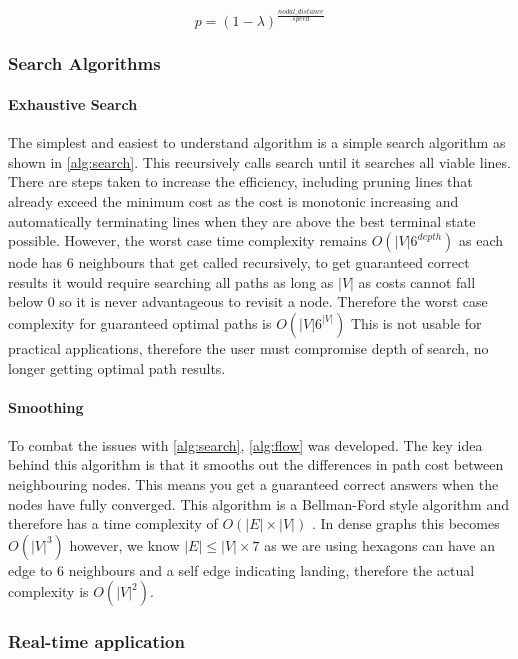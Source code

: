 \begin{equation}\label{eq:p calc}
    p = (1-\lambda)^{\frac{nodal\_distance}{speed}}
\end{equation}

\subsubsection{Search Algorithms}


\paragraph{Exhaustive Search}
The simplest and easiest to understand algorithm is a simple search algorithm as shown in \ref{alg:search}. This recursively calls search until it searches all viable lines. There are steps taken to increase the efficiency, including pruning lines that already exceed the minimum cost as the cost is monotonic increasing and automatically terminating lines when they are above the best terminal state possible. However, the worst case time complexity remains $O(|V|6^{depth})$ as each node has 6 neighbours that get called recursively, to get guaranteed correct results it would require searching all paths as long as $|V|$ as costs cannot fall below 0 so it is never advantageous to revisit a node. Therefore the worst case complexity for guaranteed optimal paths is $O(|V|6^{|V|})$ This is not usable for practical applications, therefore the user must compromise depth of search, no longer getting optimal path results.
\paragraph{Smoothing}
To combat the issues with \ref{alg:search}, \ref{alg:flow} was developed. The key idea behind this algorithm is that it smooths out the differences in path cost between neighbouring nodes. This means you get a guaranteed correct answers when the nodes have fully converged. This algorithm is a Bellman-Ford style algorithm and therefore has a time complexity of $O(|E|\times |V|)$ \cite{REF}. In dense graphs this becomes  $O(|V|^3)$ however, we know $|E| \leq |V| \times 7$ as we are using hexagons can have an edge to 6 neighbours and a self edge indicating landing, therefore the actual complexity is $O(|V|^2)$. 

\subsubsection{Real-time application}
